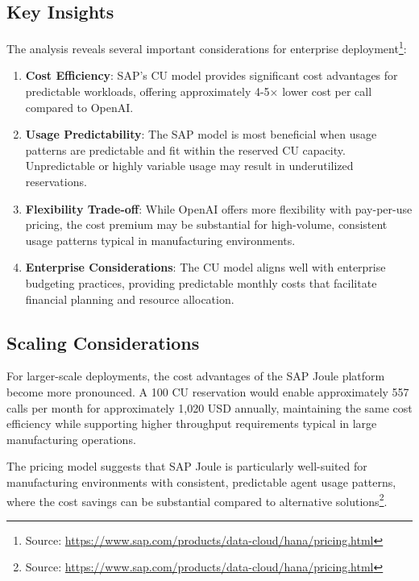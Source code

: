 \subsection{Key Insights}

The analysis reveals several important considerations for enterprise deployment\footnote{Source: \url{https://www.sap.com/products/data-cloud/hana/pricing.html}}:

\begin{enumerate}
    \item \textbf{Cost Efficiency}: SAP's CU model provides significant cost advantages for predictable workloads, offering approximately 4-5× lower cost per call compared to OpenAI.
    
    \item \textbf{Usage Predictability}: The SAP model is most beneficial when usage patterns are predictable and fit within the reserved CU capacity. Unpredictable or highly variable usage may result in underutilized reservations.
    
    \item \textbf{Flexibility Trade-off}: While OpenAI offers more flexibility with pay-per-use pricing, the cost premium may be substantial for high-volume, consistent usage patterns typical in manufacturing environments.
    
    \item \textbf{Enterprise Considerations}: The CU model aligns well with enterprise budgeting practices, providing predictable monthly costs that facilitate financial planning and resource allocation.
\end{enumerate}

\subsection{Scaling Considerations}

For larger-scale deployments, the cost advantages of the SAP Joule platform become more pronounced. A 100 CU reservation would enable approximately 557 calls per month for approximately 1,020 USD annually, maintaining the same cost efficiency while supporting higher throughput requirements typical in large manufacturing operations.

The pricing model suggests that SAP Joule is particularly well-suited for manufacturing environments with consistent, predictable agent usage patterns, where the cost savings can be substantial compared to alternative solutions\footnote{Source: \url{https://www.sap.com/products/data-cloud/hana/pricing.html}}.

